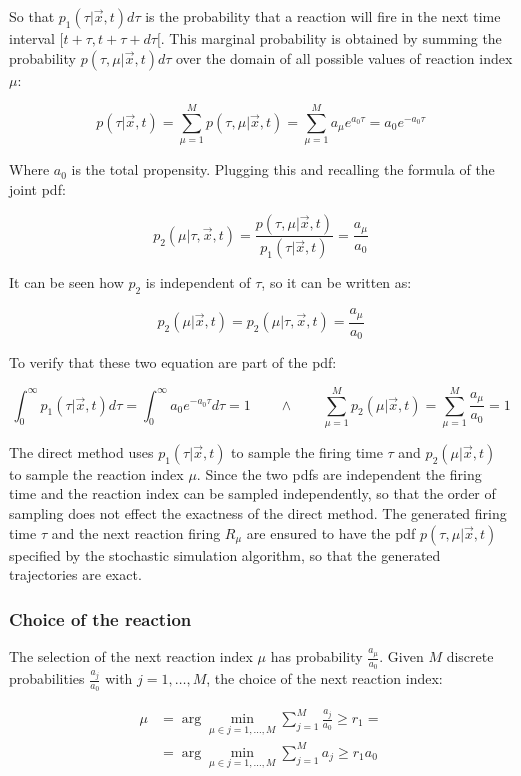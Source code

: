   So that $p_1(\tau|\vec{x},t)d\tau$ is the probability that a reaction will fire in the next time interval $[t+\tau, t+\tau+d\tau[$.
  This marginal probability is obtained by summing the probability $p(\tau, \mu|\vec{x},t)d\tau$ over the domain of all possible values of reaction index $\mu$:

  $$p(\tau|\vec{x},t) = \sum\limits_{\mu=1}^Mp(\tau, \mu|\vec{x},t) = \sum\limits_{\mu=1}^Ma_\mu e^{a_0\tau} = a_0e^{-a_0\tau}$$

  Where $a_0$ is the total propensity.
  Plugging this and recalling the formula of the joint pdf:

  $$p_2(\mu|\tau,\vec{x},t) = \frac{p(\tau,\mu|\vec{x},t)}{p_1(\tau|\vec{x},t)} = \frac{a_\mu}{a_0}$$

  It can be seen how $p_2$ is independent of $\tau$, so it can be written as:

  $$p_2(\mu|\vec{x},t) = p_2(\mu|\tau,\vec{x},t) = \frac{a_\mu}{a_0}$$

  To verify that these two equation are part of the pdf:

  $$\int_0^{\infty}p_1(\tau|\vec{x},t)d\tau = \int_0^{\infty}a_0e^{-a_0\tau}d\tau = 1 \qquad\land\qquad \sum\limits_{\mu=1}^Mp_2(\mu|\vec{x},t) = \sum\limits_{\mu=1}^M\frac{a_\mu}{a_0} = 1$$

  The direct method uses $p_1(\tau|\vec{x},t)$ to sample the firing time $\tau$ and $p_2(\mu|\vec{x},t)$ to sample the reaction index $\mu$.
  Since the two pdfs are independent the firing time and the reaction index can be sampled independently, so that the order of sampling does not effect the exactness of the direct method.
  The generated firing time $\tau$ and the next reaction firing $R_\mu$ are ensured to have the pdf $p(\tau,\mu|\vec{x},t)$ specified by the stochastic simulation algorithm, so that the generated trajectories are exact.

    \subsubsection{Choice of the reaction}
    The selection of the next reaction index $\mu$ has probability $\frac{a_\mu}{a_0}$.
    Given $M$ discrete probabilities $\frac{a_j}{a_0}$ with $j = 1,\dots, M$, the choice of the next reaction index:

    \begin{align*}
      \mu &= \arg\min\limits_{\mu\in j=1,\dots,M}\sum\limits_{j=1}^M\frac{a_j}{a_0}\ge r_1 =\\
        &= \arg\min\limits_{\mu\in j=1,\dots,M}\sum\limits_{j=1}^Ma_j\ge r_1a_0
    \end{align*}

